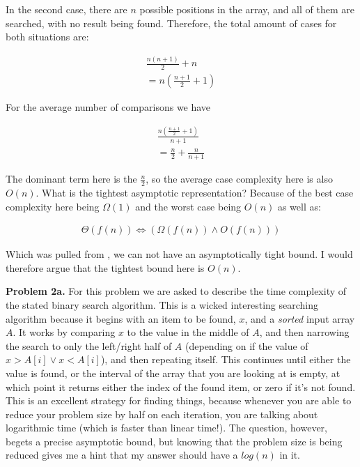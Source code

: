 \documentclass{article}
\begin{document}
In the second case, there are $n$ possible positions in the array, and all of them are searched, with no result being found. Therefore, the total amount of cases for both situations are:

\begin{gather}
    \frac{n(n+1)}{2} + n \\
    = n(\frac{n+1}{2}+1)
\end{gather}

For the average number of comparisons we have 

\begin{gather}
    \frac{n(\frac{n+1}{2}+1)}{n+1} \\
    = \frac{n}{2} + \frac{n}{n+1}
\end{gather}

The dominant term here is the $\frac{n}{2}$, so the average case complexity here is also $O(n)$. What is the tightest asymptotic representation? Because of the best case complexity here being $\Omega(1)$ and the worst case being $O(n)$ as well as:

\begin{gather}
    \Theta(f(n)) \Leftrightarrow (\Omega(f(n)) \land O(f(n)))
\end{gather}

Which was pulled from \cite{website:1}, we can not have an asymptotically tight bound. I would therefore argue that the tightest bound here is $O(n)$.


\hfill

\textbf{Problem 2a.} For this problem we are asked to describe the time complexity of the stated binary search algorithm. This is a wicked interesting searching algorithm because it begins with an item to be found, $x$, and a \emph{sorted} input array $A$. It works by comparing $x$ to the value in the middle of $A$, and then narrowing the search to only the left/right half of $A$ (depending on if the value of $x > A[i] \lor x < A[i]$), and then repeating itself. This continues until either the value is found, or the interval of the array that you are looking at is empty, at which point it returns either the index of the found item, or zero if it's not found. This is an excellent strategy for finding things, because whenever you are able to reduce your problem size by half on each iteration, you are talking about logarithmic time (which is faster than linear time!). The question, however, begets a precise asymptotic bound, but knowing that the problem size is being reduced gives me a hint that my answer should have a $log(n)$ in it.
\end{document}
